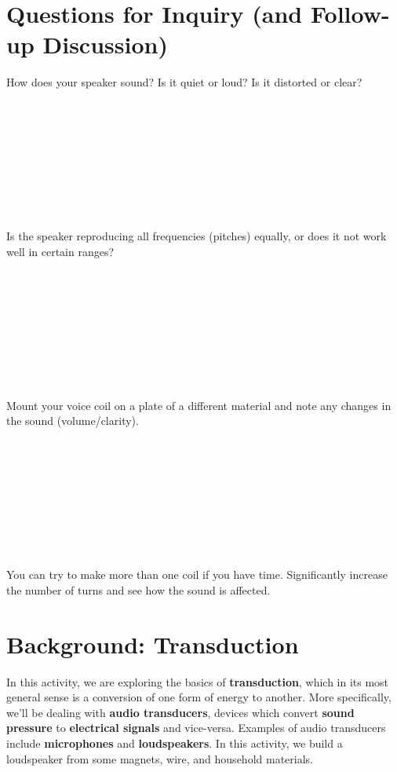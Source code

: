 \documentclass[11pt]{article}
\begin{document}
\section*{Questions for Inquiry (and Follow-up Discussion)}

How does your speaker sound? Is it quiet or loud? Is it distorted or clear?
\\ \\ \\ \\ \\ \\ \\ \\ \\ \\
Is the speaker reproducing all frequencies (pitches) equally, or does it not work well in certain ranges?
\\ \\ \\ \\ \\ \\ \\ \\ \\ \\
Mount your voice coil on a plate of a different material and note any changes in the sound (volume/clarity).
\\ \\ \\ \\ \\ \\ \\ \\ \\ \\
You can try to make more than one coil if you have time.  Significantly increase the number of turns and see how the sound is affected.

\newpage

\section*{Background: Transduction}			%
In this activity, we are exploring the basics of {\bf transduction}, which in its most general sense is a conversion of one form of energy to another. More specifically, we'll be dealing with {\bf audio transducers}, devices which convert {\bf sound pressure} to {\bf electrical signals} and vice-versa. Examples of audio transducers include {\bf microphones} and {\bf loudspeakers}. In this activity, we build a loudspeaker from some magnets, wire, and household materials.
\end{document}
